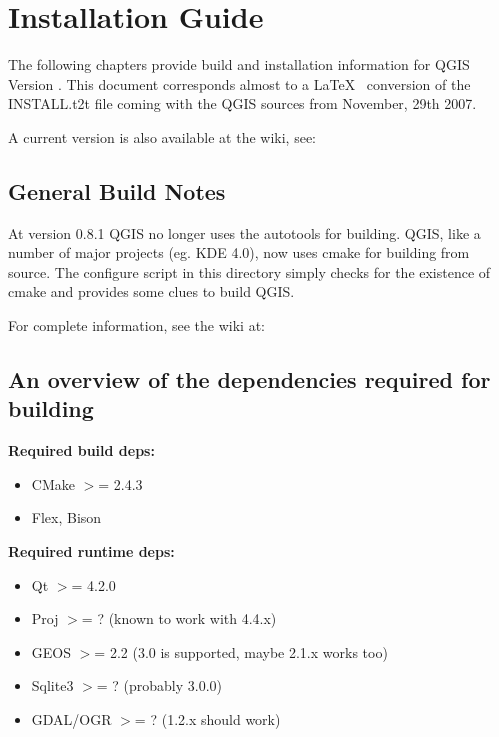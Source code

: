 \section{Installation Guide}

The following chapters provide build and installation information for QGIS 
Version \CURRENT. This document corresponds almost to a \LaTeX~ conversion of 
the INSTALL.t2t file coming with the QGIS sources from November, 29th 2007.

A current version is also available at the wiki, see:

\subsection{General Build Notes}

At version 0.8.1 QGIS no longer uses the autotools for building. QGIS, like a
number of major projects (eg. KDE 4.0), now uses cmake for building from
source. The configure script in this directory simply checks for the existence
of cmake and provides some clues to build QGIS.

For complete information, see the wiki at:

\subsection{An overview of the dependencies required for building}

\textbf{Required build deps:}

\begin {itemize}
\item CMake $>$= 2.4.3
\item Flex, Bison
\end{itemize}

\textbf{Required runtime deps:}

\begin {itemize}
\item Qt $>$= 4.2.0
\item Proj $>$= ? (known to work with 4.4.x)
\item GEOS $>$= 2.2 (3.0 is supported, maybe 2.1.x works too)
\item Sqlite3 $>$= ? (probably 3.0.0)
\item GDAL/OGR $>$= ? (1.2.x should work)
\end{itemize}


